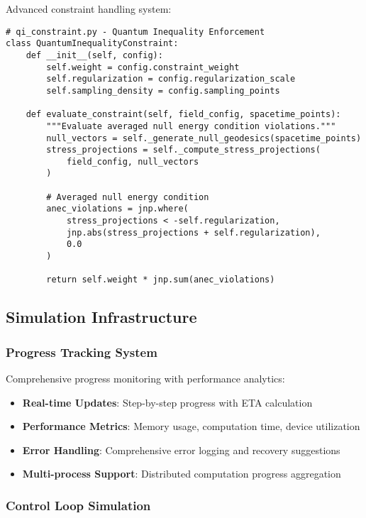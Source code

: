 \documentclass{article}
\begin{document}
Advanced constraint handling system:

\begin{lstlisting}
# qi_constraint.py - Quantum Inequality Enforcement
class QuantumInequalityConstraint:
    def __init__(self, config):
        self.weight = config.constraint_weight
        self.regularization = config.regularization_scale
        self.sampling_density = config.sampling_points
    
    def evaluate_constraint(self, field_config, spacetime_points):
        """Evaluate averaged null energy condition violations."""
        null_vectors = self._generate_null_geodesics(spacetime_points)
        stress_projections = self._compute_stress_projections(
            field_config, null_vectors
        )
        
        # Averaged null energy condition
        anec_violations = jnp.where(
            stress_projections < -self.regularization,
            jnp.abs(stress_projections + self.regularization),
            0.0
        )
        
        return self.weight * jnp.sum(anec_violations)
\end{lstlisting}

\subsection{Simulation Infrastructure}

\subsubsection{Progress Tracking System}

Comprehensive progress monitoring with performance analytics:

\begin{itemize}
\item \textbf{Real-time Updates}: Step-by-step progress with ETA calculation
\item \textbf{Performance Metrics}: Memory usage, computation time, device utilization
\item \textbf{Error Handling}: Comprehensive error logging and recovery suggestions
\item \textbf{Multi-process Support}: Distributed computation progress aggregation
\end{itemize}

\subsubsection{Control Loop Simulation}
\end{document}

